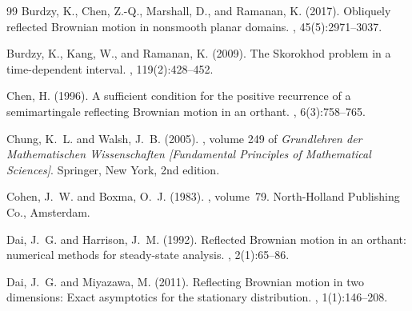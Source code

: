\documentclass[11pt]{article}
\theoremstyle{definition}
\begin{document}
\begin{thebibliography}{99}
Burdzy, K., Chen, Z.-Q., Marshall, D., and Ramanan, K. (2017).
\newblock Obliquely reflected Brownian motion in nonsmooth planar domains.
, 45(5):2971--3037.

Burdzy, K., Kang, W., and Ramanan, K. (2009).
\newblock The Skorokhod problem in a time-dependent interval.
, 119(2):428--452.


Chen, H. (1996).
\newblock A sufficient condition for the positive recurrence of a
  semimartingale reflecting {B}rownian motion in an orthant.
, 6(3):758--765.

Chung, K.~L. and Walsh, J.~B. (2005).
, volume
  249 of {\em Grundlehren der Mathematischen Wissenschaften [Fundamental
  Principles of Mathematical Sciences]}.
\newblock Springer, New York, 2nd edition.

Cohen, J.~W. and Boxma, O.~J. (1983).
, volume~79.
\newblock North-Holland Publishing Co., Amsterdam.


Dai, J.~G. and Harrison, J.~M. (1992).
\newblock Reflected {Brownian} motion in an orthant: numerical methods for
  steady-state analysis.
, 2(1):65--86.

Dai, J.~G. and Miyazawa, M. (2011).
\newblock Reflecting {Brownian} motion in two dimensions: {Exact} asymptotics
  for the stationary distribution.
, 1(1):146--208.



\end{thebibliography}
\end{document}
